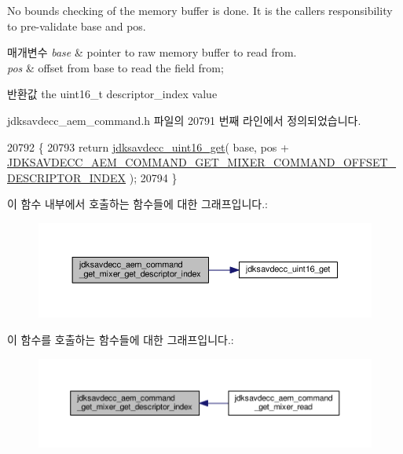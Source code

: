 No bounds checking of the memory buffer is done. It is the caller\textquotesingle{}s responsibility to pre-\/validate base and pos.


\begin{DoxyParams}{매개변수}
{\em base} & pointer to raw memory buffer to read from. \\
\hline
{\em pos} & offset from base to read the field from; \\
\hline
\end{DoxyParams}
\begin{DoxyReturn}{반환값}
the uint16\+\_\+t descriptor\+\_\+index value 
\end{DoxyReturn}


jdksavdecc\+\_\+aem\+\_\+command.\+h 파일의 20791 번째 라인에서 정의되었습니다.


\begin{DoxyCode}
20792 \{
20793     \textcolor{keywordflow}{return} \hyperlink{group__endian_ga3fbbbc20be954aa61e039872965b0dc9}{jdksavdecc\_uint16\_get}( base, pos + 
      \hyperlink{group__command__get__mixer_gad21b17d001fae167e07d8864456b11ca}{JDKSAVDECC\_AEM\_COMMAND\_GET\_MIXER\_COMMAND\_OFFSET\_DESCRIPTOR\_INDEX}
       );
20794 \}
\end{DoxyCode}


이 함수 내부에서 호출하는 함수들에 대한 그래프입니다.\+:
\nopagebreak
\begin{figure}[H]
\begin{center}
\leavevmode
\includegraphics[width=350pt]{group__command__get__mixer_ga92f6563898a4ca71092ee8e18673300c_cgraph}
\end{center}
\end{figure}




이 함수를 호출하는 함수들에 대한 그래프입니다.\+:
\nopagebreak
\begin{figure}[H]
\begin{center}
\leavevmode
\includegraphics[width=350pt]{group__command__get__mixer_ga92f6563898a4ca71092ee8e18673300c_icgraph}
\end{center}
\end{figure}



